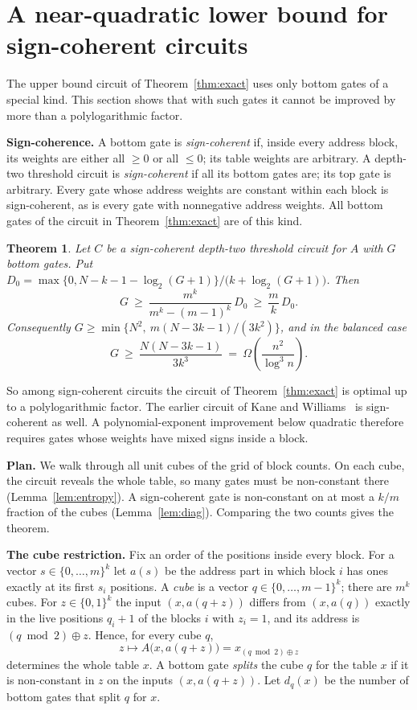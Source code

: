 \documentclass[11pt,letterpaper]{article}
\newtheorem{theorem}{Theorem}
\theoremstyle{remark}
\newcommand{\bits}{\{0,1\}}
\newcommand{\sect}[1]{\section{\texorpdfstring{\color{ink}#1}{#1}}}
\newcommand{\smalltitle}[1]{\textbf{\color{ink}#1}\quad}
\begin{document}
\sect{A near-quadratic lower bound for sign-coherent circuits}\label{sec:coherent}

The upper bound circuit of Theorem~\ref{thm:exact} uses only bottom gates of a special
kind. This section shows that with such gates it cannot be improved by more
than a polylogarithmic factor.

\smalltitle{Sign-coherence.}
A bottom gate is \emph{sign-coherent} if, inside every address block, its
weights are either all $\ge0$ or all $\le0$; its table weights are
arbitrary. A depth-two threshold circuit is \emph{sign-coherent} if all its
bottom gates are; its top gate is arbitrary. Every gate whose address
weights are constant within each block is sign-coherent, as is every gate
with nonnegative address weights. All bottom gates of the circuit in Theorem~\ref{thm:exact} are of this kind.

\begin{theorem}\label{thm:coherent}
Let $C$ be a sign-coherent depth-two threshold circuit for $A$ with $G$
bottom gates. Put $D_0=\max\{0,N-k-1-\log_2(G+1)\}/\bigl(k+\log_2(G+1)\bigr)$. Then
\[
G\ \ge\ \frac{m^k}{m^k-(m-1)^k}\,D_0\ \ge\ \frac mk\,D_0 .
\]
Consequently $G\ge\min\{N^2,\ m(N-3k-1)/(3k^2)\}$, and in the balanced case
\[
G\ \ge\ \frac{N(N-3k-1)}{3k^3}\ =\ \Omega\!\left(\frac{n^2}{\log^3 n}\right).
\]
\end{theorem}

So among sign-coherent circuits the circuit of Theorem~\ref{thm:exact} is
optimal up to a polylogarithmic factor. The earlier circuit of Kane and
Williams~\cite[Thm.~1.2]{KW} is sign-coherent as well. A polynomial-exponent improvement below quadratic therefore requires
gates whose weights have mixed signs inside a block.

\smalltitle{Plan.}
We walk through all unit cubes of the grid of block counts. On each cube,
the circuit reveals the whole table, so many gates must be non-constant there
(Lemma~\ref{lem:entropy}). A sign-coherent gate is non-constant on at most a
$k/m$ fraction of the cubes (Lemma~\ref{lem:diag}). Comparing the two counts
gives the theorem.

\smalltitle{The cube restriction.}
Fix an order of the positions inside every block. For a vector
$s\in\{0,\dots,m\}^k$ let $a(s)$ be the address part in which block $i$ has
ones exactly at its first $s_i$ positions. A \emph{cube} is a vector
$q\in\{0,\dots,m-1\}^k$; there are $m^k$ cubes. For $z\in\bits^k$ the input
$(x,a(q+z))$ differs from $(x,a(q))$ exactly in the live positions
$q_i+1$ of the blocks $i$ with $z_i=1$, and its address is
$(q\bmod2)\oplus z$. Hence, for every cube $q$,
\[
z\mapsto A\bigl(x,a(q+z)\bigr)=x_{(q\bmod 2)\oplus z}
\]
determines the whole table $x$. A bottom gate \emph{splits} the cube $q$ for
the table $x$ if it is non-constant in $z$ on the inputs $(x,a(q+z))$. Let
$d_q(x)$ be the number of bottom gates that split $q$ for $x$.
\end{document}
